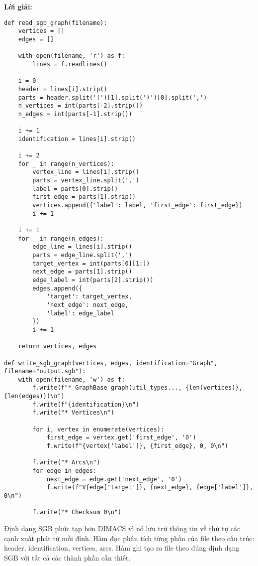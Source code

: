 \documentclass[12pt]{article}
\begin{document}
\textbf{Lời giải:}

\begin{lstlisting}
def read_sgb_graph(filename):
    vertices = []
    edges = []
    
    with open(filename, 'r') as f:
        lines = f.readlines()
    
    i = 0
    header = lines[i].strip()
    parts = header.split('(')[1].split(')')[0].split(',')
    n_vertices = int(parts[-2].strip())
    n_edges = int(parts[-1].strip())
    
    i += 1
    identification = lines[i].strip()
    
    i += 2
    for _ in range(n_vertices):
        vertex_line = lines[i].strip()
        parts = vertex_line.split(',')
        label = parts[0].strip()
        first_edge = parts[1].strip()
        vertices.append({'label': label, 'first_edge': first_edge})
        i += 1
    
    i += 1
    for _ in range(n_edges):
        edge_line = lines[i].strip()
        parts = edge_line.split(',')
        target_vertex = int(parts[0][1:])
        next_edge = parts[1].strip()
        edge_label = int(parts[2].strip())
        edges.append({
            'target': target_vertex,
            'next_edge': next_edge,
            'label': edge_label
        })
        i += 1
    
    return vertices, edges

def write_sgb_graph(vertices, edges, identification="Graph", filename="output.sgb"):
    with open(filename, 'w') as f:
        f.write(f"* GraphBase graph(util_types..., {len(vertices)}, {len(edges)})\n")
        f.write(f"{identification}\n")
        f.write("* Vertices\n")
        
        for i, vertex in enumerate(vertices):
            first_edge = vertex.get('first_edge', '0')
            f.write(f"{vertex['label']}, {first_edge}, 0, 0\n")
        
        f.write("* Arcs\n")
        for edge in edges:
            next_edge = edge.get('next_edge', '0')
            f.write(f"V{edge['target']}, {next_edge}, {edge['label']}, 0\n")
        
        f.write("* Checksum 0\n")
\end{lstlisting}

Định dạng SGB phức tạp hơn DIMACS vì nó lưu trữ thông tin về thứ tự các cạnh xuất phát từ mỗi đỉnh. Hàm đọc phân tích từng phần của file theo cấu trúc: header, identification, vertices, arcs. Hàm ghi tạo ra file theo đúng định dạng SGB với tất cả các thành phần cần thiết.
\end{document}
